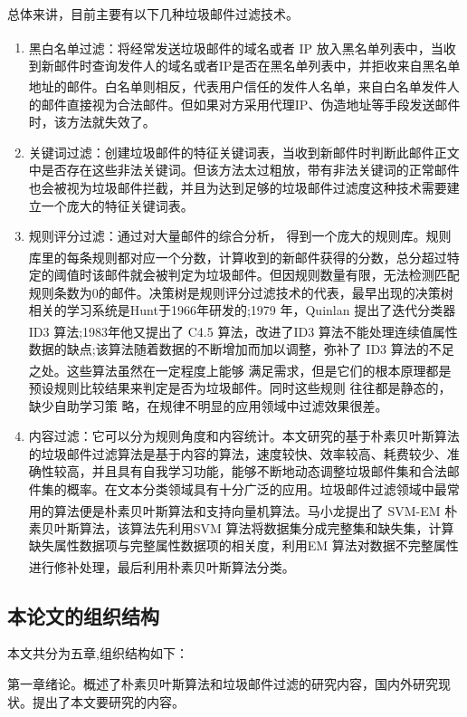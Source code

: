 \documentclass[UTF8,zihao=-4]{ctexart}
\newcommand{\upcite}[1]{\textsuperscript{\cite{#1}}}
\begin{document}
总体来讲，目前主要有以下几种垃圾邮件过滤技术。
\begin{enumerate}
	\item 黑白名单过滤\upcite{anti-spam}：将经常发送垃圾邮件的域名或者 IP 放入黑名单列表中，当收到新邮件时查询发件人的域名或者IP是否在黑名单列表中，并拒收来自黑名单地址的邮件\upcite{zhangpei}。白名单则相反，代表用户信任的发件人名单，来自白名单发件人的邮件直接视为合法邮件。但如果对方采用代理IP、伪造地址等手段发送邮件时，该方法就失效了。
	\item 关键词过滤：创建垃圾邮件的特征关键词表，当收到新邮件时判断此邮件正文中是否存在这些非法关键词。但该方法太过粗放，带有非法关键词的正常邮件也会被视为垃圾邮件拦截，并且为达到足够的垃圾邮件过滤度这种技术需要建立一个庞大的特征关键词表。
	\item 规则评分过滤：通过对大量邮件的综合分析， 得到一个庞大的规则库。规则库里的每条规则都对应一个分数，计算收到的新邮件获得的分数\upcite{zhangpei}，总分超过特定的阈值时该邮件就会被判定为垃圾邮件。但因规则数量有限，无法检测匹配规则条数为0的邮件。决策树是规则评分过滤技术的代表，最早出现的决策树相关的学习系统是Hunt于1966年研发的;1979 年，Quinlan 提出了迭代分类器 ID3 算法;1983年他又提出了 C4.5 算法\upcite{haibo,wux}，改进了ID3 算法不能处理连续值属性数据的缺点;该算法随着数据的不断增加而加以调整，弥补了 ID3 算法的不足之处\upcite{caocuiling}。这些算法虽然在一定程度上能够 满足需求，但是它们的根本原理都是预设规则比较结果来判定是否为垃圾邮件。同时这些规则 往往都是静态的，缺少自助学习策 略，在规律不明显的应用领域中过滤效果很差。
	
	\item 内容过滤：它可以分为规则角度和内容统计。本文研究的基于朴素贝叶斯算法的垃圾邮件过滤算法是基于内容的算法，速度较快、效率较高、耗费较少、准确性较高，并且具有自我学习功能，能够不断地动态调整垃圾邮件集和合法邮件集的概率。在文本分类领域具有十分广泛的应用。垃圾邮件过滤领域中最常用的算法便是朴素贝叶斯算法和支持向量机算法\upcite{yanglei}。马小龙提出了 SVM-EM 朴素贝叶斯算法，该算法先利用SVM 算法将数据集分成完整集和缺失集，计算缺失属性数据项与完整属性数据项的相关度，利用EM 算法对数据不完整属性进行修补处理，最后利用朴素贝叶斯算法分类\upcite{maxiaolong}。
\end{enumerate}

\subsection{本论文的组织结构}
	本文共分为五章,组织结构如下：
	
	第一章绪论。概述了朴素贝叶斯算法和垃圾邮件过滤的研究内容，国内外研究现状。提出了本文要研究的内容。
	
\end{document}

